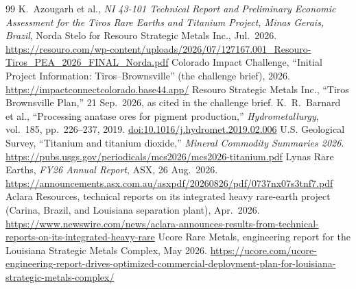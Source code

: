\documentclass[11pt,letterpaper]{article}
\begin{document}
\FloatBarrier
\renewcommand{\refname}{References}
{\footnotesize
\begin{thebibliography}{99}\setlength{\itemsep}{-1pt}
 K.~Azougarh et al., \emph{NI 43-101 Technical Report and Preliminary Economic Assessment for the Tiros Rare Earths and Titanium Project, Minas Gerais, Brazil}, Norda Stelo for Resouro Strategic Metals Inc., Jul.~2026. \url{https://resouro.com/wp-content/uploads/2026/07/127167.001_Resouro-Tiros_PEA_2026_FINAL_Norda.pdf}
 Colorado Impact Challenge, ``Initial Project Information: Tiros--Brownsville'' (the challenge brief), 2026. \url{https://impactconnectcolorado.base44.app/}
 Resouro Strategic Metals Inc., ``Tiros Brownsville Plan,'' 21 Sep.~2026, as cited in the challenge brief.
 K.~R.~Barnard et al., ``Processing anatase ores for pigment production,'' \emph{Hydrometallurgy}, vol.~185, pp.~226--237, 2019. \href{https://doi.org/10.1016/j.hydromet.2019.02.006}{doi:10.1016/j.hydromet.2019.02.006}
 U.S. Geological Survey, ``Titanium and titanium dioxide,'' \emph{Mineral Commodity Summaries 2026}. \url{https://pubs.usgs.gov/periodicals/mcs2026/mcs2026-titanium.pdf}
 Lynas Rare Earths, \emph{FY26 Annual Report}, ASX, 26 Aug.~2026. \url{https://announcements.asx.com.au/asxpdf/20260826/pdf/0737nx07s3tnf7.pdf}
 Aclara Resources, technical reports on its integrated heavy rare-earth project (Carina, Brazil, and Louisiana separation plant), Apr.~2026. \url{https://www.newswire.com/news/aclara-announces-results-from-technical-reports-on-its-integrated-heavy-rare}
 Ucore Rare Metals, engineering report for the Louisiana Strategic Metals Complex, May 2026. \url{https://ucore.com/ucore-engineering-report-drives-optimized-commercial-deployment-plan-for-louisiana-strategic-metals-complex/}
\end{thebibliography}}
\end{document}
